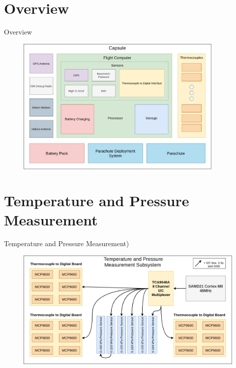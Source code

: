 \documentclass[UKenglish]{beamer}
\begin{document}
\section{Overview}
\begin{frame}{Overview}
	
	\begin{figure}[h!]
		\centering
		\includegraphics[width=0.9\textwidth]{images/amtps-avionics.png}
	\end{figure}
	
	
\end{frame}



\section{Temperature and Pressure Measurement}
\begin{frame}{Temperature and Pressure Measurement)}
	
	\begin{figure}[h!]
		\centering
		\includegraphics[width=\textwidth]{images/amtps-temp-pressure-subsystem.png}
	\end{figure}
	
	
\end{frame}
\end{document}
